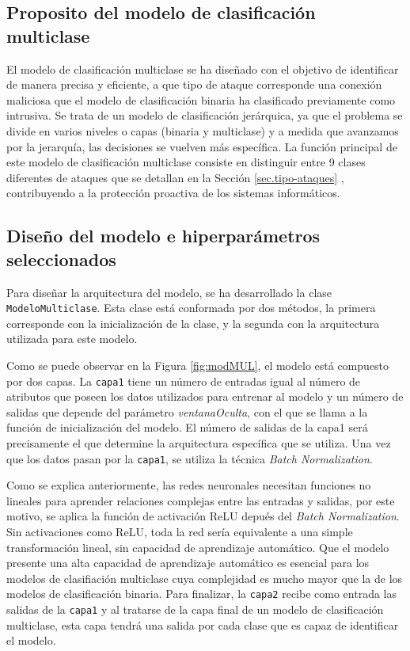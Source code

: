 \subsection{Proposito del modelo de clasificación multiclase}

El modelo de clasificación multiclase se ha diseñado con el objetivo de identificar de manera precisa y eficiente, a que tipo de ataque corresponde una conexión maliciosa que el modelo de clasificación binaria ha clasificado previamente como intrusiva. Se trata de un modelo  de clasificación jerárquica, ya que el problema se divide en varios niveles o capas (binaria y multiclase) y a medida que avanzamos por la jerarquía, las decisiones se vuelven más específica. La función principal de este modelo de clasificación multiclase consiste en distinguir entre 9 clases diferentes de ataques que se detallan en la Sección \ref{sec.tipo-ataques} , contribuyendo a la protección proactiva de los sistemas informáticos.

\subsection{Diseño del modelo e hiperparámetros seleccionados} \label{sec:disMUL}
Para diseñar la arquitectura del modelo, se ha desarrollado la clase \texttt{ModeloMulticlase}. Esta clase está conformada por dos métodos, la primera corresponde con la inicialización de la clase, y la segunda con la arquitectura utilizada para este modelo.

Como se puede observar en la Figura \ref{fig:modMUL}, el modelo está compuesto por dos capas. La \texttt{capa1} tiene un número de entradas igual al número de atributos que poseen los datos utilizados para entrenar al modelo y un número de salidas que depende del parámetro \textit{ventanaOculta}, con el que se llama a la función de inicialización del modelo. El número de salidas de la capa1 será precisamente el que determine la arquitectura específica que se utiliza. Una vez que los datos pasan por la \texttt{capa1}, se utiliza la técnica \textit{Batch Normalization}. 

Como se explica anteriormente, las redes neuronales necesitan funciones no lineales para aprender relaciones complejas entre las entradas y salidas, por este motivo, se aplica la función de activación ReLU depués del \textit{Batch Normalization}. Sin activaciones como ReLU, toda la red sería equivalente a una simple transformación lineal, sin capacidad de aprendizaje automático. Que el modelo presente una alta capacidad de aprendizaje automático es esencial para los modelos de clasifiación multiclase cuya complejidad es mucho mayor que la de los modelos de clasificación binaria. Para finalizar, la \texttt{capa2} recibe como entrada las salidas de la \texttt{capa1} y al tratarse de la capa final de un modelo de clasificación multiclase, esta capa tendrá una salida por cada clase que es capaz de identificar el modelo.

